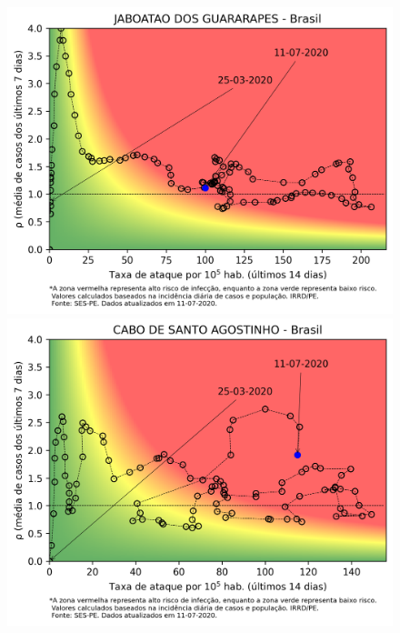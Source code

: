 \documentclass[]{article}
\begin{document}
\begin{figure}[!h]
	\begin{minipage}[t]{4cm}
	\centering
	\includegraphics[scale=0.5]{../JABOATAO DOS GUARARAPES.png}
\end{minipage}
\hspace{5cm}
\begin{minipage}[t]{4cm}
	\centering
	\includegraphics[scale=0.5]{../CABO DE SANTO AGOSTINHO.png}
	\vspace{0.2cm}
\end{minipage}


\end{figure}
\end{document}
